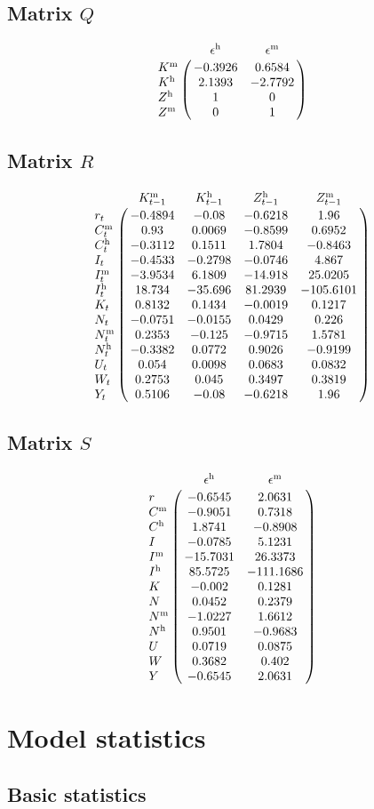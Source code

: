 \subsection*{Matrix $Q$}

$$\bordermatrix{
~ & \epsilon^{\mathrm{h}} & \epsilon^{\mathrm{m}} \cr
K^{\mathrm{m}} & -0.3926 & 0.6584 \cr
K^{\mathrm{h}} & 2.1393 & -2.7792 \cr
Z^{\mathrm{h}} & 1 & 0 \cr
Z^{\mathrm{m}} & 0 & 1 \cr
}$$

\subsection*{Matrix $R$}

$$\bordermatrix{
~ & K^{\mathrm{m}}_{t-1} & K^{\mathrm{h}}_{t-1} & Z^{\mathrm{h}}_{t-1} & Z^{\mathrm{m}}_{t-1} \cr
r_{t} & -0.4894 & -0.08 & -0.6218 & 1.96 \cr
C^{\mathrm{m}}_{t} & 0.93 & 0.0069 & -0.8599 & 0.6952 \cr
C^{\mathrm{h}}_{t} & -0.3112 & 0.1511 & 1.7804 & -0.8463 \cr
I_{t} & -0.4533 & -0.2798 & -0.0746 & 4.867 \cr
I^{\mathrm{m}}_{t} & -3.9534 & 6.1809 & -14.918 & 25.0205 \cr
I^{\mathrm{h}}_{t} & 18.734 & -35.696 & 81.2939 & -105.6101 \cr
K_{t} & 0.8132 & 0.1434 & -0.0019 & 0.1217 \cr
N_{t} & -0.0751 & -0.0155 & 0.0429 & 0.226 \cr
N^{\mathrm{m}}_{t} & 0.2353 & -0.125 & -0.9715 & 1.5781 \cr
N^{\mathrm{h}}_{t} & -0.3382 & 0.0772 & 0.9026 & -0.9199 \cr
U_{t} & 0.054 & 0.0098 & 0.0683 & 0.0832 \cr
W_{t} & 0.2753 & 0.045 & 0.3497 & 0.3819 \cr
Y_{t} & 0.5106 & -0.08 & -0.6218 & 1.96 \cr
}$$

\subsection*{Matrix $S$}

$$\bordermatrix{
~ & \epsilon^{\mathrm{h}} & \epsilon^{\mathrm{m}} \cr
r & -0.6545 & 2.0631 \cr
C^{\mathrm{m}} & -0.9051 & 0.7318 \cr
C^{\mathrm{h}} & 1.8741 & -0.8908 \cr
I & -0.0785 & 5.1231 \cr
I^{\mathrm{m}} & -15.7031 & 26.3373 \cr
I^{\mathrm{h}} & 85.5725 & -111.1686 \cr
K & -0.002 & 0.1281 \cr
N & 0.0452 & 0.2379 \cr
N^{\mathrm{m}} & -1.0227 & 1.6612 \cr
N^{\mathrm{h}} & 0.9501 & -0.9683 \cr
U & 0.0719 & 0.0875 \cr
W & 0.3682 & 0.402 \cr
Y & -0.6545 & 2.0631 \cr
}$$


\section{Model statistics}

\subsection{Basic statistics}

